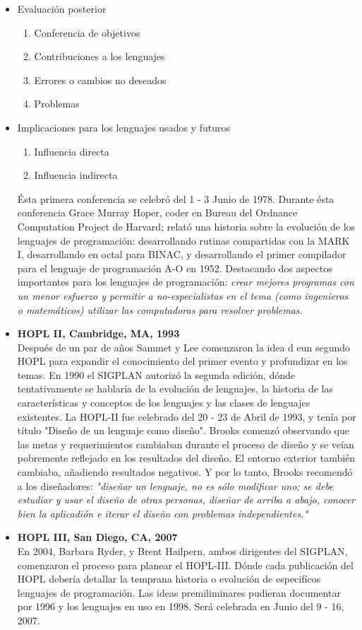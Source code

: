 \documentclass{article}
\begin{document}
\begin{itemize}
\begin{itemize}
		\item Evaluación posterior
		\begin{enumerate}
			\item Conferencia de objetivos
			\item Contribuciones a los lenguajes
			\item Errores o cambios no deseados
			\item Problemas
		\end{enumerate}
		\item Implicaciones para los lenguajes usados y futuros
		\begin{enumerate}
			\item Influencia directa
			\item Influencia indirecta
		\end{enumerate}
		Ésta primera conferencia se celebró del 1 - 3 Junio de 1978. Durante ésta conferencia Grace Murray Hoper, coder en Bureau del Ordnance Computation Project de Harvard; relató una historia sobre la evolución de los lenguajes de programación: desarrollando rutinas compartidas con la MARK I, desarrollando en octal para BINAC, y desarrollando el primer compilador para el lenguaje de programación A-O en 1952. Destacando dos aspectos importantes para los lenguajes de programación: \textit{crear mejores programas con un menor esfuerzo y permitir a no-especialistas en el tema (como ingenieros o matemáticos) utilizar las computadoras para resolver problemas.}
		\item \textbf{HOPL II, Cambridge, MA, 1993} \\Después de un par de años Sammet y Lee comenzaron la idea d eun segundo HOPL para expandir el conocimiento del primer evento y profundizar en los temas. En 1990 el SIGPLAN autorizó la segunda edición, dónde tentativamente se hablaría de la evolución de lenguajes, la historia de las características y conceptos de los lenguajes y las clases de lenguajes existentes. La HOPL-II fue celebrado del 20 - 23 de Abril de 1993, y tenía por título "Diseño de un lenguaje como diseño". Brooks comenzó observando que las metas y requerimientos cambiaban durante el proceso de diseño y se veían pobremente reflejado en los resultados del diseño. El entorno exterior también cambiaba, añadiendo resultados negativos. Y por lo tanto, Brooks recomendó a los diseñadores: \textit{"diseñar un lenguaje, no es sólo modificar uno; se debe estudiar y usar el diseño de otras personas, diseñar de arriba a abajo, conocer bien la aplicadión e iterar el diseño con problemas independientes."}
		\item \textbf{HOPL III, San Diego, CA, 2007} \\ En 2004, Barbara Ryder, y Brent Hailpern, ambos dirigentes del SIGPLAN, comenzaron el proceso para planear el HOPL-III. Dónde cada publicación del HOPL debería detallar la temprana historia o evolución de especifícos lenguajes de programación. Las ideas premiliminares pudieran documentar por 1996 y los lenguajes en uso en 1998. Será celebrada en Junio del 9 - 16, 2007.
	\end{itemize}
\end{itemize}
\end{document}
